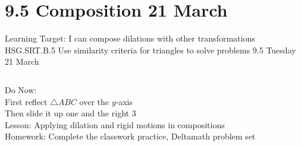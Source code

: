 \documentclass[onlytextwidth, aspectratio=169]{beamer}
\begin{document}
\section{9.5 Composition \hfill 21 March \,}
\begin{frame}{Learning Target: I can compose dilations with other transformations}
  {HSG.SRT.B.5 Use similarity criteria for triangles to solve problems \hfill \alert{9.5 Tuesday 21 March}}
  \begin{columns}
    Do Now:\\
    First reflect $\triangle ABC$ over the $y$-axis \\
    Then slide it up one and the right 3 \\[0.5cm]
    Lesson: Applying dilation and rigid motions in compositions \\[0.5cm]
    Homework: Complete the classwork practice, Deltamath problem set \\[0.5cm]
    \begin{flushright}
    \end{flushright}
  \end{columns}
\end{frame}
\end{document}
